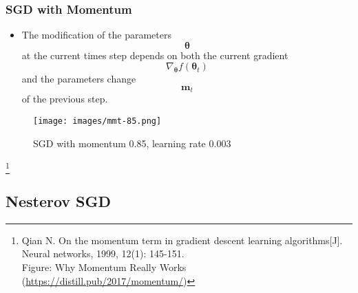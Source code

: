 \documentclass[10pt]{beamer}
\theoremstyle{mystyle}
\def\bb#1{\mathbf{#1}}
\newcommand{\bst}{\boldsymbol\theta}
\newcommand\blfootnote[1]{%
  \begingroup
  \renewcommand\thefootnote{}\footnote[frame]{#1}%
  \addtocounter{footnote}{-1}%
  \endgroup
}
\theoremstyle{mystyle}
\begin{document}
\begin{frame}
	\frametitle{SGD with Momentum}
	\begin{itemize}
		\item The modification of the parameters $$ \bst $$ at the current times step depends on both the current gradient $$ \nabla_{\bst}f(\bst_t) $$ and the parameters change $$ \bb m_t $$ of the previous step. 
	\end{itemize}

	\begin{figure}[H]
		\centering
		\texttt{[image: images/mmt-85.png]}
		\caption{SGD with momentum 0.85, learning rate 0.003}
	\end{figure}
	
	\blfootnote{Qian N. On the momentum term in gradient descent learning algorithms[J]. Neural networks, 1999, 12(1): 145-151.\\
	Figure: Why Momentum Really Works (\url{https://distill.pub/2017/momentum/})}
\end{frame}

\subsection{Nesterov SGD}
\end{document}
